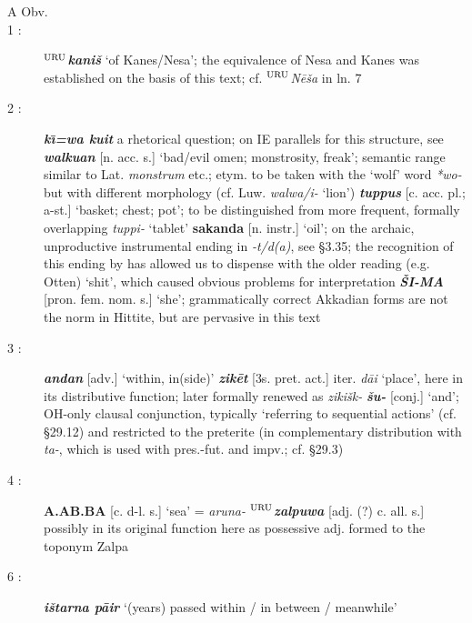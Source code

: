 \documentclass[10pt]{article}
\newcommand{\supersc}[1]{$^{\textrm{\scriptsize{#1}}}$}  	%
\newcommand{\bit}[1]{\textbf{\textit{#1}}}				%
\newcommand{\p}[1]{{\tiny[{#1}]}}					%
\newcommand{\labk}{k{\supersc{w}}}							%
\newcommand{\I}{\={\i}}									%
\newcommand{\city}{\supersc{URU}}
\renewcommand{\.}[1]{\textsubdot{#1}}
\begin{document}
\begin{description}
\smallskip

\item[A Obv.]

\smallskip

\item[1 :] \textbf{\city}\bit{kani\v{s}} `of Kanes/Nesa'; the equivalence of Nesa and Kanes was established on the basis of this text; cf. {\city}\textit{N\=e\v{s}a} in ln. 7

\item[2 :] \bit{k\I=wa kuit} a rhetorical question; on IE parallels for this structure, see \citet{hackstein2004kuit} \bit{walkuan} \p{n. acc. s.} `bad/evil omen; monstrosity, freak'; semantic range similar to Lat. \textit{monstrum} etc.; etym. to be taken with the `wolf' word \textit{*w\textsubring{l}{\labk}o-} but with different morphology (cf. Luw. \textit{walwa/i-} `lion') \bit{tuppus} \p{c. acc. pl.; a-st.} `basket; chest; pot'; to be distinguished from more frequent, formally overlapping \textit{tuppi-} `tablet'  \textbf{sakanda} \p{n. instr.} `oil'; on the archaic, unproductive instrumental ending in \textit{-t/d(a)}, see  \S3.35; the recognition of this ending by \citet{hoffner1995oil} has allowed us to dispense with the older reading (e.g. Otten) `shit', which caused obvious problems for interpretation \bit{\v{S}I-MA} \p{pron. fem. nom. s.} `she'; grammatically correct Akkadian forms are not the norm in Hittite, but are pervasive in this text
 
\item[3 :] \bit{andan} \p{adv.} `within, in(side)' \bit{zik\=et} \p{3s. pret. act.} iter. \textit{d\=ai} `place', here in its distributive function; later formally renewed as \textit{ziki\v{s}k-} \bit{\v{su}-} \p{conj.} `and'; OH-only clausal conjunction, typically `referring to sequential actions' (cf.  \S29.12) and restricted to the preterite (in complementary distribution with \textit{ta-}, which is used with pres.-fut. and impv.; cf.  \S29.3)

\item[4 :] \textbf{A.AB.BA} \p{c. d-l. s.} `sea' = \textit{aruna-} \textbf{\city}\bit{zalpuwa} 
\p{adj. (?) c. all. s.} possibly in its original function here as possessive adj. formed to the toponym Zalpa

\item[6 :] \bit{i\v{s}tarna p\=air} `(years) passed within / in between / meanwhile'


\end{description}
\end{document}
